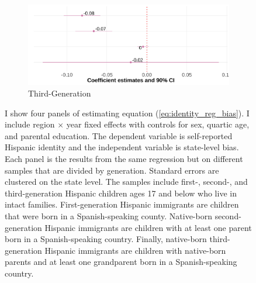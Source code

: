 \documentclass[12pt,english]{article}
\begin{document}
\begin{center}
\begin{figure}[!htb]
\begin{subfigure}{.48\textwidth}
\caption{Third-Generation}
\centering
\includegraphics[width=.9\linewidth]{figure/skin-iat-regression-third-gen.png}
\end{subfigure}
\caption*{\footnotesize{I show four panels of estimating equation (\ref{eq:identity_reg_bias}). I include region $\times$ year fixed effects with controls for sex, quartic age, and parental education. The dependent variable is self-reported Hispanic identity and the independent variable is state-level bias. Each panel is the results from the same regression but on different samples that are divided by generation. Standard errors are clustered on the state level. The samples include first-, second-, and third-generation Hispanic children ages 17 and below who live in intact families. First-generation Hispanic immigrants are children that were born in a Spanish-speaking county. Native-born second-generation Hispanic immigrants are children with at least one parent born in a Spanish-speaking country. Finally, native-born third-generation Hispanic immigrants are children with native-born parents and at least one grandparent born in a Spanish-speaking country.}}
\end{figure}
\end{center}

\pagebreak
\newpage
\end{document}
